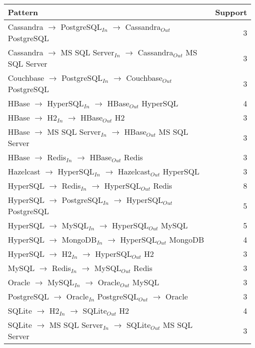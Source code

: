 \begin{tabular}{lr}
\hline
\textbf{Pattern} & \textbf{Support} \\
\hline
Cassandra $\rightarrow$ PostgreSQL$_{In}$ $\rightarrow$ Cassandra$_{Out}$    PostgreSQL & 3 \\
Cassandra $\rightarrow$ MS SQL Server$_{In}$ $\rightarrow$ Cassandra$_{Out}$    MS SQL Server & 3 \\
\hline
Couchbase $\rightarrow$ PostgreSQL$_{In}$ $\rightarrow$ Couchbase$_{Out}$    PostgreSQL & 3 \\
\hline
HBase $\rightarrow$ HyperSQL$_{In}$ $\rightarrow$ HBase$_{Out}$    HyperSQL & 4 \\
HBase $\rightarrow$ H2$_{In}$ $\rightarrow$ HBase$_{Out}$    H2 & 3 \\
HBase $\rightarrow$ MS SQL Server$_{In}$ $\rightarrow$ HBase$_{Out}$    MS SQL Server & 3 \\
HBase $\rightarrow$ Redis$_{In}$ $\rightarrow$ HBase$_{Out}$    Redis & 3 \\
\hline
Hazelcast $\rightarrow$ HyperSQL$_{In}$ $\rightarrow$ Hazelcast$_{Out}$    HyperSQL & 3 \\
\hline
HyperSQL $\rightarrow$ Redis$_{In}$ $\rightarrow$ HyperSQL$_{Out}$    Redis & 8 \\
HyperSQL $\rightarrow$ PostgreSQL$_{In}$ $\rightarrow$ HyperSQL$_{Out}$    PostgreSQL & 5 \\
HyperSQL $\rightarrow$ MySQL$_{In}$ $\rightarrow$ HyperSQL$_{Out}$    MySQL & 5 \\
HyperSQL $\rightarrow$ MongoDB$_{In}$ $\rightarrow$ HyperSQL$_{Out}$    MongoDB & 4 \\
HyperSQL $\rightarrow$ H2$_{In}$ $\rightarrow$ HyperSQL$_{Out}$    H2 & 3 \\
\hline
MySQL $\rightarrow$ Redis$_{In}$ $\rightarrow$ MySQL$_{Out}$    Redis & 3 \\
\hline
Oracle $\rightarrow$ MySQL$_{In}$ $\rightarrow$ Oracle$_{Out}$    MySQL & 3 \\
\hline
PostgreSQL $\rightarrow$ Oracle$_{In}$    PostgreSQL$_{Out}$ $\rightarrow$ Oracle & 3 \\
\hline
SQLite $\rightarrow$ H2$_{In}$ $\rightarrow$ SQLite$_{Out}$    H2 & 4 \\
SQLite $\rightarrow$ MS SQL Server$_{In}$ $\rightarrow$ SQLite$_{Out}$    MS SQL Server & 3 \\
\hline
\end{tabular}
